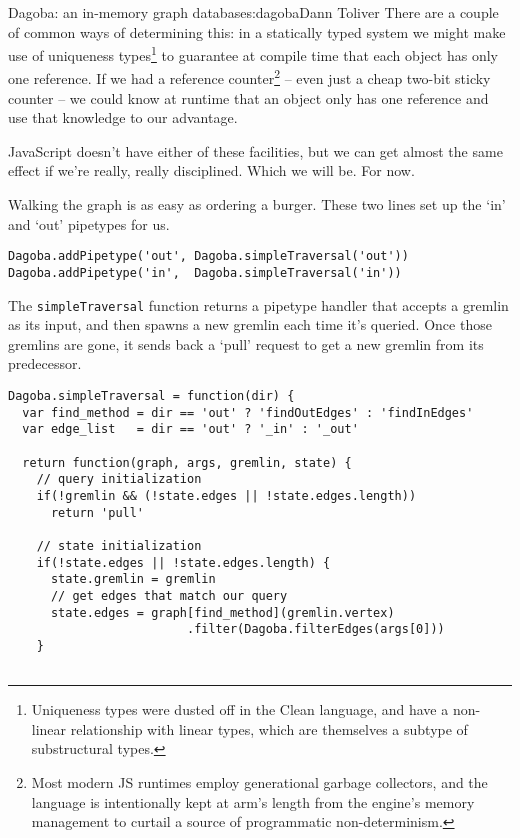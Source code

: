 \begin{aosachapter}{Dagoba: an in-memory graph database}{s:dagoba}{Dann Toliver}
There are a couple of common ways of determining this: in a statically
typed system we might make use of uniqueness types\footnote{Uniqueness
  types were dusted off in the Clean language, and have a non-linear
  relationship with linear types, which are themselves a subtype of
  substructural types.} to guarantee at compile time that each object
has only one reference. If we had a reference counter\footnote{Most
  modern JS runtimes employ generational garbage collectors, and the
  language is intentionally kept at arm's length from the engine's
  memory management to curtail a source of programmatic non-determinism.}
-- even just a cheap two-bit sticky counter -- we could know at runtime
that an object only has one reference and use that knowledge to our
advantage.

JavaScript doesn't have either of these facilities, but we can get
almost the same effect if we're really, really disciplined. Which we
will be. For now.

\label{in-n-out}

Walking the graph is as easy as ordering a burger. These two lines set
up the `in' and `out' pipetypes for us.

\begin{verbatim}
Dagoba.addPipetype('out', Dagoba.simpleTraversal('out'))
Dagoba.addPipetype('in',  Dagoba.simpleTraversal('in'))
\end{verbatim}

The \texttt{simpleTraversal} function returns a pipetype handler that
accepts a gremlin as its input, and then spawns a new gremlin each time
it's queried. Once those gremlins are gone, it sends back a `pull'
request to get a new gremlin from its predecessor.

\begin{verbatim}
Dagoba.simpleTraversal = function(dir) {
  var find_method = dir == 'out' ? 'findOutEdges' : 'findInEdges'
  var edge_list   = dir == 'out' ? '_in' : '_out'
  
  return function(graph, args, gremlin, state) {
    // query initialization
    if(!gremlin && (!state.edges || !state.edges.length))         
      return 'pull'
      
    // state initialization
    if(!state.edges || !state.edges.length) {                     
      state.gremlin = gremlin
      // get edges that match our query
      state.edges = graph[find_method](gremlin.vertex)            
                         .filter(Dagoba.filterEdges(args[0]))
    }


\end{verbatim}
\end{aosachapter}
